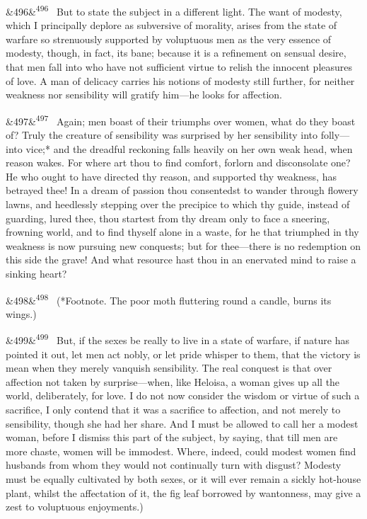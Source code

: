 \documentclass[12pt]{article}
\newcommand{\para}[1][]{\par\noindent\ifx&#1&\else\textsuperscript{\footnotesize #1}~\fi}
\begin{document}
\para[496] But to state the subject in a different light. The want of modesty, which I principally deplore as subversive of morality, arises from the state of warfare so strenuously supported by voluptuous men as the very essence of modesty, though, in fact, its bane; because it is a refinement on sensual desire, that men fall into who have not sufficient virtue to relish the innocent pleasures of love. A man of delicacy carries his notions of modesty still further, for neither weakness nor sensibility will gratify him---he looks for affection.

\para[497] Again; men boast of their triumphs over women, what do they boast of? Truly the creature of sensibility was surprised by her sensibility into folly---into vice;* and the dreadful reckoning falls heavily on her own weak head, when reason wakes. For where art thou to find comfort, forlorn and disconsolate one? He who ought to have directed thy reason, and supported thy weakness, has betrayed thee! In a dream of passion thou consentedst to wander through flowery lawns, and heedlessly stepping over the precipice to which thy guide, instead of guarding, lured thee, thou startest from thy dream only to face a sneering, frowning world, and to find thyself alone in a waste, for he that triumphed in thy weakness is now pursuing new conquests; but for thee---there is no redemption on this side the grave! And what resource hast thou in an enervated mind to raise a sinking heart?

\para[498] (*Footnote. The poor moth fluttering round a candle, burns its wings.)

\para[499] But, if the sexes be really to live in a state of warfare, if nature has pointed it out, let men act nobly, or let pride whisper to them, that the victory is mean when they merely vanquish sensibility. The real conquest is that over affection not taken by surprise---when, like Heloisa, a woman gives up all the world, deliberately, for love. I do not now consider the wisdom or virtue of such a sacrifice, I only contend that it was a sacrifice to affection, and not merely to sensibility, though she had her share. And I must be allowed to call her a modest woman, before I dismiss this part of the subject, by saying, that till men are more chaste, women will be immodest. Where, indeed, could modest women find husbands from whom they would not continually turn with disgust? Modesty must be equally cultivated by both sexes, or it will ever remain a sickly hot-house plant, whilst the affectation of it, the fig leaf borrowed by wantonness, may give a zest to voluptuous enjoyments.)
\end{document}

